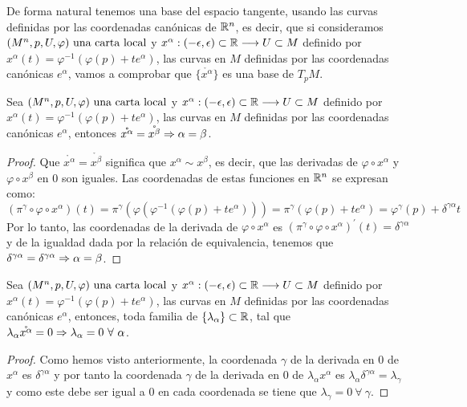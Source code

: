 De forma natural tenemos una base del espacio tangente, usando las curvas definidas por las
coordenadas canónicas de $\mathbb{R}^n$, es decir, que si consideramos $(M^n,p,U,\varphi)\textmd{ una carta local}$ y $x^\alpha:(-\epsilon, \epsilon)\subset\mathbb{R}\longrightarrow U\subset M$ definido por $x^\alpha(t)=\varphi^{-1}(\varphi(p)+te^\alpha)$, las curvas en $M$
definidas por las coordenadas canónicas $e^\alpha$,
vamos a comprobar que $\{\mathring{x^\alpha}\}$ es una base de $T_pM$.

\begin{proposition}
  Sea $(M^n,p,U,\varphi)\textmd{ una carta local}$ y $x^\alpha:(-\epsilon, \epsilon)\subset\mathbb{R}\longrightarrow U\subset M$ definido por $x^\alpha(t)=\varphi^{-1}(\varphi(p)+te^\alpha)$, las
  curvas en
  $M$
  definidas por las coordenadas canónicas $e^\alpha$, entonces
  $\mathring{x^\alpha}=\mathring{x^\beta}\Rightarrow\alpha=\beta$.
\end{proposition}
\begin{proof}
  Que $\mathring{x^\alpha}=\mathring{x^\beta}$ significa que
  $x^\alpha\sim x^\beta$, es decir, que las derivadas de
  $\varphi\circ x^\alpha$ y $\varphi\circ x^\beta$ en 0 son iguales.
  Las coordenadas de estas funciones en $\mathbb{R}^n$ se expresan como:
  \begin{equation*}
    (\pi^\gamma\circ\varphi\circ x^\alpha)(t)=\pi^\gamma(\varphi(\varphi^{-1}(\varphi(p)
    +te^\alpha)))=\pi^\gamma(\varphi(p)
    +te^\alpha)=\varphi^\gamma(p)+\delta^{\gamma\alpha} t
  \end{equation*}
  Por lo tanto, las coordenadas de la derivada de $\varphi\circ x^\alpha$ es
  $(\pi^\gamma\circ\varphi\circ x^\alpha)^\prime(t)=\delta^{\gamma\alpha}$ y de la igualdad dada
  por la relación de equivalencia, tenemos que
  $\delta^{\gamma\alpha}=\delta^{\gamma\alpha}\Rightarrow\alpha=\beta$.
\end{proof}

\begin{proposition}
  Sea $(M^n,p,U,\varphi)\textmd{ una carta local}$ y $x^\alpha:(-\epsilon, \epsilon)\subset\mathbb{R}\longrightarrow U\subset M$ definido por $x^\alpha(t)=\varphi^{-1}(\varphi(p)+te^\alpha)$, las curvas en
  $M$
  definidas por las coordenadas canónicas $e^\alpha$, entonces, toda familia de
  $\{\lambda_\alpha\}\subset\mathbb{R}$, tal que
  $\lambda_\alpha\mathring{x^\alpha}=0\so\lambda_\alpha=0\ \forall\ \alpha$.
\end{proposition}
\begin{proof}
  Como hemos visto anteriormente, la coordenada $\gamma$ de la derivada en $0$ de $x^\alpha$ es
  $\delta^{\gamma\alpha}$ y por tanto la coordenada $\gamma$ de la derivada en $0$ de
  $\lambda_\alpha x^\alpha$ es $\lambda_\alpha\delta^{\gamma\alpha}=\lambda_\gamma$ y como este
  debe ser igual a $0$ en cada coordenada se tiene que $\lambda_\gamma=0\ \forall\ \gamma$.
\end{proof}

